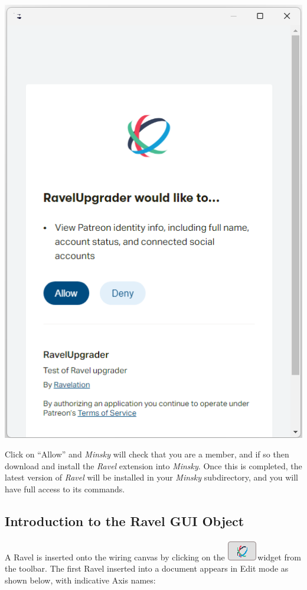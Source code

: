 \includegraphics{images/RavelUpgradeForm}

Click on ``Allow'' and \emph{Minsky} will check that you are a member,
and if so then download and install the \emph{Ravel} extension into
\emph{Minsky}. Once this is completed, the latest version of \emph{Ravel
}will be installed in your \emph{Minsky }subdirectory, and you will
have full access to its commands.

\subsection{Introduction to the Ravel GUI Object}

\label{Ravel-GUI Object}

A Ravel is inserted onto the wiring canvas by clicking on the \includegraphics{images/RavelWidget}widget
from the toolbar. The first Ravel inserted into a document appears
in Edit mode as shown below, with indicative Axis names:

